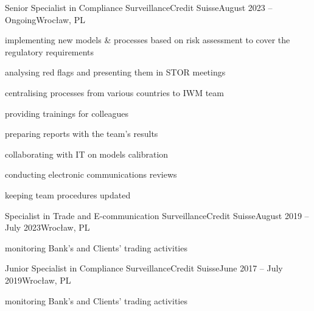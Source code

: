 
\begin{cveventi}{Senior Specialist in Compliance Surveillance}{Credit Suisse}{August 2023 -- Ongoing}{Wroc\l aw, PL}
	\item implementing new models \& processes based on risk assessment to cover the regulatory requirements
	\item analysing red flags and presenting them in STOR meetings
	\item centralising processes from various countries to IWM team
	\item providing trainings for colleagues
	\item preparing reports with the team's results
	\item collaborating with IT on models calibration
	\item conducting electronic communications reviews
	\item keeping team procedures updated
\end{cveventi}
%
\divider
\begin{cveventis}{Specialist in Trade and E-communication Surveillance}{Credit Suisse}{August 2019 -- July 2023}{Wroc\l aw, PL}
	\item monitoring Bank's and Clients' trading activities
\end{cveventis}
%
\divider
\begin{cveventis}{Junior Specialist in Compliance Surveillance}{Credit Suisse}{June 2017 -- July 2019}{Wroc\l aw, PL}
	\item monitoring Bank’s and Clients' trading activities
\end{cveventis}




